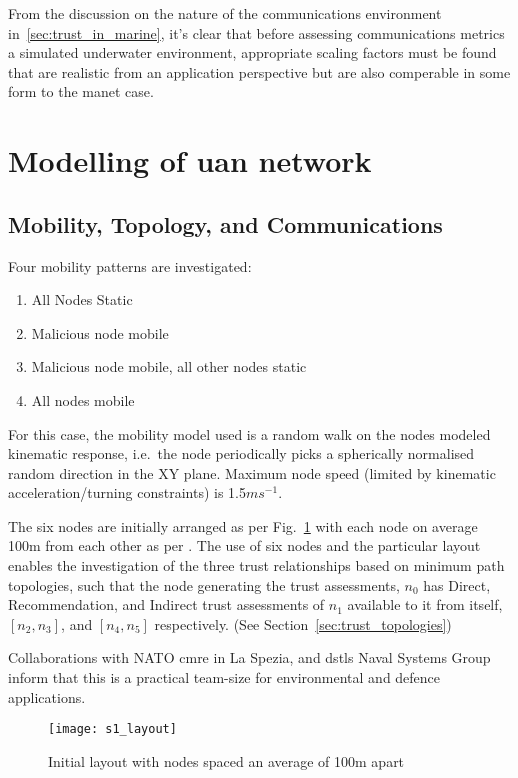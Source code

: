 From the discussion on the nature of the communications environment in~\autoref{sec:trust_in_marine}, it's clear that before assessing communications metrics a simulated underwater environment, appropriate scaling factors must be found that are realistic from an application perspective but are also comperable in some form to the \gls{manet} case.


\section{Modelling of \gls{uan} network}\label{sec:initialsystemcharacterization}


\subsection{Mobility, Topology, and Communications}

Four mobility patterns are investigated:
\begin{enumerate}
	\item All Nodes Static
	\item Malicious node mobile
	\item Malicious node mobile, all other nodes static
	\item All nodes mobile
\end{enumerate}

For this case, the mobility model used is a random walk on the nodes modeled kinematic response, i.e.\ the node periodically picks a spherically normalised random direction in the XY plane.
Maximum node speed (limited by kinematic acceleration/turning constraints) is 1.5$ms^{-1}$.


The six nodes are initially arranged as per Fig.~\ref{fig:s1_layout} with each node on average 100m from each other as per \cite{Guo11}.
The use of six nodes and the particular layout enables the investigation of the three trust relationships based on minimum path topologies, such that the node generating the trust assessments, $n_0$ has Direct, Recommendation, and Indirect trust assessments of $n_1$ available to it from itself, $[n_2,n_3]$, and $[n_4,n_5]$ respectively. 
(See Section~\ref{sec:trust_topologies})

Collaborations with NATO \gls{cmre} in La Spezia, and \glspl{dstl} Naval Systems Group inform that this is a practical team-size for environmental and defence applications.

%
\begin{figure}[h]
	\centering
	\texttt{[image: s1\_layout]}
	\caption{Initial layout with nodes spaced an average of 100m apart}
	\label{fig:s1_layout}
\end{figure}
%

